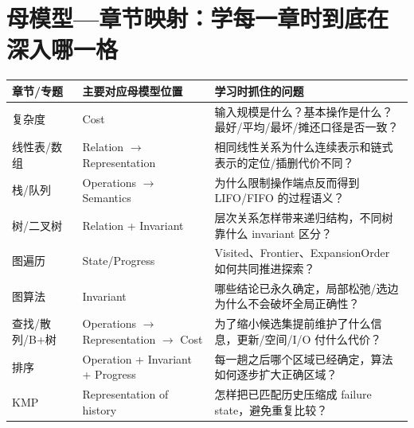 \documentclass[11pt,a4paper,openany]{ctexbook}
\begin{document}
\section{母模型—章节映射：学每一章时到底在深入哪一格}
\begin{longtable}{L{3.0cm}L{4.2cm}L{\dimexpr\linewidth-8.47cm\relax}}
\toprule
\textbf{章节/专题} & \textbf{主要对应母模型位置} & \textbf{学习时抓住的问题}\\
\midrule
复杂度 & Cost & 输入规模是什么？基本操作是什么？最好/平均/最坏/摊还口径是否一致？\\
线性表/数组 & Relation $\to$ Representation & 相同线性关系为什么连续表示和链式表示的定位/插删代价不同？\\
栈/队列 & Operations $\to$ Semantics & 为什么限制操作端点反而得到 LIFO/FIFO 的过程语义？\\
树/二叉树 & Relation + Invariant & 层次关系怎样带来递归结构，不同树靠什么 invariant 区分？\\
图遍历 & State/Progress & Visited、Frontier、ExpansionOrder 如何共同推进探索？\\
图算法 & Invariant & 哪些结论已永久确定，局部松弛/选边为什么不会破坏全局正确性？\\
查找/散列/B+树 & Operations $\to$ Representation $\to$ Cost & 为了缩小候选集提前维护了什么信息，更新/空间/I/O 付什么代价？\\
排序 & Operation + Invariant + Progress & 每一趟之后哪个区域已经确定，算法如何逐步扩大正确区域？\\
KMP & Representation of history & 怎样把已匹配历史压缩成 failure state，避免重复比较？\\
\bottomrule
\end{longtable}
\end{document}
